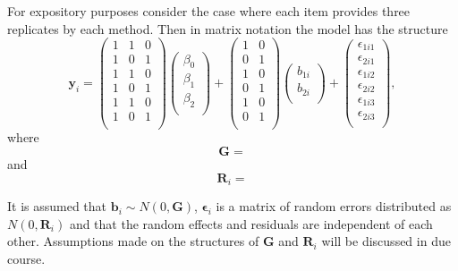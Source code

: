 \documentclass[12pt, a4paper]{report}
\theoremstyle{plain}
\theoremstyle{definition}
\theoremstyle{remark}
\begin{document}
	\vspace{1in}
	
	For expository purposes consider the case where each item provides three replicates by each method. Then in matrix notation the model has the structure
	\begin{equation}
	\boldsymbol{y}_{i} =
	\left(
	\begin{array}{ccc}
	1 & 1 & 0 \\
	1 & 0 & 1 \\
	1 & 1 & 0 \\
	1 & 0 & 1 \\
	1 & 1 & 0 \\
	1 & 0 & 1 \\
	\end{array}
	\right)
	\left(
	\begin{array}{c}         \beta_0 \\ \beta_1 \\ \beta_2 \\
	\end{array}
	\right)
	+  \left(
	\begin{array}{cc}
	1 & 0 \\
	0 & 1 \\
	1 & 0 \\
	0 & 1 \\
	1 & 0 \\
	0 & 1 \\
	\end{array}
	\right)\left(
	\begin{array}{c}
	b_{1i} \\   b_{2i} \\
	\end{array}
	\right)
	+
	\left(
	\begin{array}{c}
	\epsilon_{1i1} \\
	\epsilon_{2i1} \\
	\epsilon_{1i2} \\
	\epsilon_{2i2} \\
	\epsilon_{1i3} \\
	\epsilon_{2i3} \\
	\end{array}
	\right) ,
	\end{equation}
	where
	\[
	\boldsymbol{G} =
	\]
	and
	\[
	\boldsymbol{R}_i =
	\]
	
	It is assumed that $\boldsymbol{b}_i \sim N(0,\boldsymbol{G})$,
	$\boldsymbol{\epsilon}_i$ is a matrix of random errors distributed as $N(0,\boldsymbol{R}_i)$ and
	that the random effects and residuals are independent of each other. Assumptions made on the structures of $\boldsymbol{G}$ and $\boldsymbol{R}_i$ will be discussed in due course.
	
\end{document}
